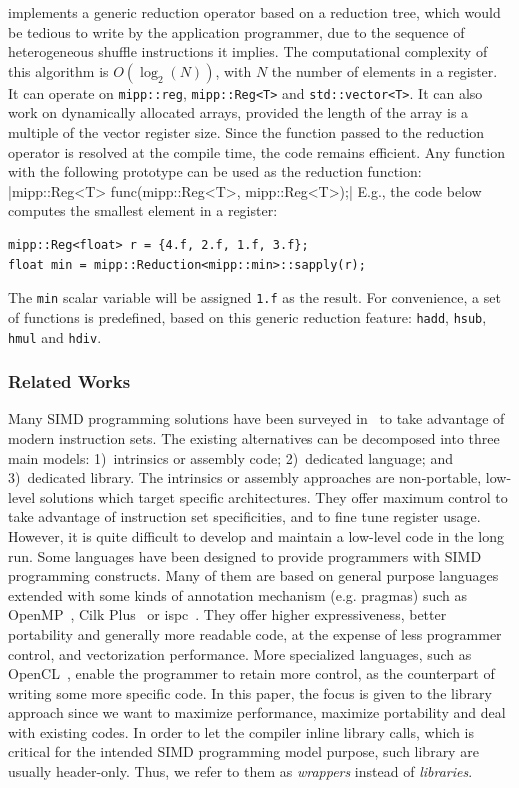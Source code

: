 \MIPP implements a generic reduction operator based on a reduction tree, which
would be tedious to write by the application programmer, due to the sequence of
heterogeneous shuffle instructions it implies. The computational complexity of
this algorithm is $O(\log_2(N))$, with $N$ the number of elements in a register.
It can operate on \verb|mipp::reg|, \verb|mipp::Reg<T>| and
\verb|std::vector<T>|. It can also work on dynamically allocated arrays,
provided the length of the array is a multiple of the vector register size.
Since the function passed to the reduction operator is resolved at the compile
time, the code remains efficient. Any function with the following prototype can
be used as the reduction function:
|mipp::Reg<T> func(mipp::Reg<T>, mipp::Reg<T>);|
E.g., the code below computes the smallest element in a register:
\begin{verbatim}
mipp::Reg<float> r = {4.f, 2.f, 1.f, 3.f};
float min = mipp::Reduction<mipp::min>::sapply(r);
\end{verbatim}
The \verb|min| scalar variable will be assigned \verb|1.f| as the result. For
convenience, a set of functions is predefined, based on this generic reduction
feature: \verb|hadd|, \verb|hsub|, \verb|hmul| and \verb|hdiv|.

\subsubsection{Related Works}

Many SIMD programming solutions have been surveyed in~\cite{Pohl2016} to take
advantage of modern instruction sets. The existing alternatives can be
decomposed into three main models: 1)~intrinsics or assembly code; 2)~dedicated
language; and 3)~dedicated library. The intrinsics or assembly approaches are
non-portable, low-level solutions which target specific architectures. They
offer maximum control to take advantage of instruction set specificities, and to
fine tune register usage. However, it is quite difficult to develop and maintain
a low-level code in the long run. Some languages have been designed to provide
programmers with SIMD programming constructs. Many of them are based on general
purpose languages extended with some kinds of annotation mechanism (e.g.
pragmas) such as OpenMP~\cite{OpenMP2013}, Cilk Plus~\cite{Robison2013} or
ispc~\cite{Pharr2012}. They offer higher expressiveness, better portability and
generally more readable code, at the expense of less programmer control, and
vectorization performance. More specialized languages, such as
OpenCL~\cite{Howes2015}, enable the programmer to retain more control, as the
counterpart of writing some more specific code.
In this paper, the focus is given to the library approach since we want to
maximize performance, maximize portability and deal with existing \Cxx codes. In
order to let the compiler inline library calls, which is critical for the
intended SIMD programming model purpose, such library are usually header-only.
Thus, we refer to them as \textit{wrappers} instead of \textit{libraries}.

